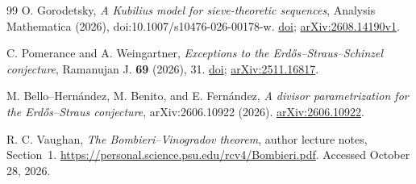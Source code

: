 \documentclass[11pt]{article}
\theoremstyle{remark}\newtheorem{remark}[theorem]{Remark}
\begin{document}
\begin{thebibliography}{99}
O. Gorodetsky,
\emph{A Kubilius model for sieve-theoretic sequences},
Analysis Mathematica (2026), doi:10.1007/s10476-026-00178-w.
\href{https://doi.org/10.1007/s10476-026-00178-w}{doi};
\href{https://arxiv.org/abs/2608.14190v1}{arXiv:2608.14190v1}.

C. Pomerance and A. Weingartner,
\emph{Exceptions to the Erd\H{o}s--Straus--Schinzel conjecture},
Ramanujan J. \textbf{69} (2026), 31.
\href{https://doi.org/10.1007/s11139-025-01312-2}{doi};
\href{https://arxiv.org/abs/2511.16817}{arXiv:2511.16817}.

M. Bello--Hern\'andez, M. Benito, and E. Fern\'andez,
\emph{A divisor parametrization for the Erd\H{o}s--Straus conjecture},
arXiv:2606.10922 (2026).
\href{https://arxiv.org/abs/2606.10922}{arXiv:2606.10922}.

R. C. Vaughan,
\emph{The Bombieri--Vinogradov theorem}, author lecture notes, Section~1.
\url{https://personal.science.psu.edu/rcv4/Bombieri.pdf}.
Accessed October 28, 2026.
\end{thebibliography}
\end{document}
